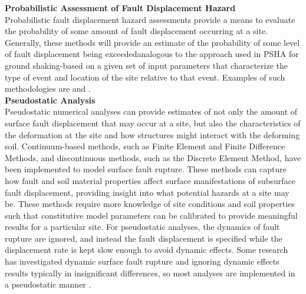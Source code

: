 \noindent\textbf{Probabilistic Assessment of Fault Displacement Hazard}\\
Probabilistic fault displacement hazard assessments provide a means to evaluate the probability of some amount of fault displacement occurring at a site. Generally, these methods will provide an estimate of the probability of some level of fault displacement being exceeded\textemdash analogous to the approach used in PSHA for ground shaking-based on a given set of input parameters that characterize the type of event and location of the site relative to that event. Examples of such methodologies are \cite{youngs2003methodology, petersen2011fault, moss2011probabilistic} and \cite{hecker2013variability}.\\

\noindent\textbf{Pseudostatic Analysis}\\
Pseudostatic numerical analyses can provide estimates of not only the amount of surface fault displacement that may occur at a site, but also the characteristics of the deformation at the site and how structures might interact with the deforming soil. Continuum-based methods, such as Finite Element and Finite Difference Methods, and discontinuous methods, such as the Discrete Element Method, have been implemented to model surface fault rupture. These methods can capture how fault and soil material properties affect surface manifestations of subsurface fault displacement, providing insight into what potential hazards at a site may be. These methods require more knowledge of site conditions and soil properties such that constitutive model parameters can be calibrated to provide meaningful results for a particular site. For pseudostatic analyses, the dynamics of fault rupture are ignored, and instead the fault displacement is specified while the displacement rate is kept slow enough to avoid dynamic effects. Some research has investigated dynamic surface fault rupture \citep{oettle2015dynamic} and ignoring dynamic effects results typically in insignificant differences, so most analyses are implemented in a pseudostatic manner \citep{anastasopoulos2007foundation, anastasopoulos2008numerical, bransby2008centrifuge_reverse, bransby2008centrifuge, oettle2013geotechnical, oettle2017numerical, garcia2018distinct, garcia2018distinct_2}.\\

